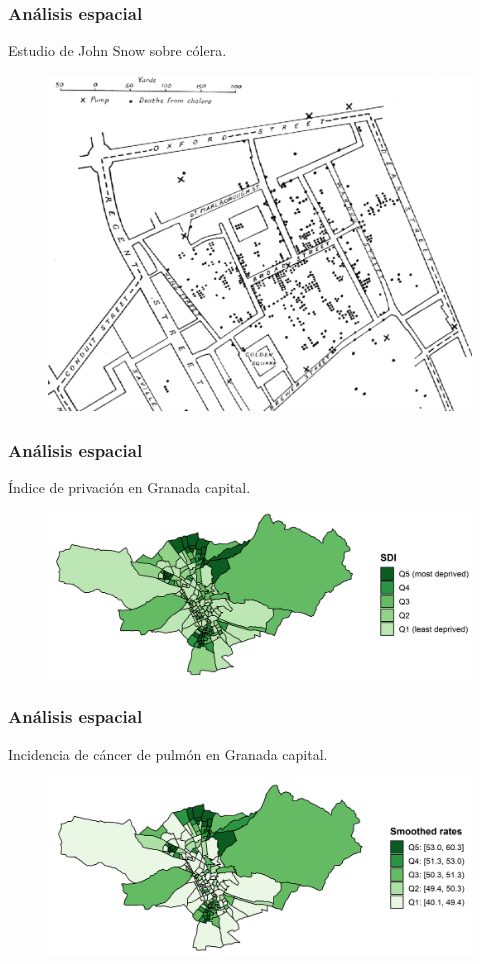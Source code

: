 \documentclass{beamer}
\begin{document}

\begin{frame}\frametitle{Análisis espacial}
	\centering Estudio de John Snow sobre cólera.
	\begin{figure}
		\centering
		\includegraphics[width=.75\textwidth]{images/mapa_3.png}
	\end{figure}
\end{frame}

\begin{frame}\frametitle{Análisis espacial}
	\centering Índice de privación en Granada capital.
	\begin{figure}
		\centering
		\includegraphics[width=.9\textwidth]{images/maps_DI_zoom.png}
	\end{figure}
\end{frame}


\begin{frame}\frametitle{Análisis espacial}

	\centering Incidencia de cáncer de pulmón en Granada capital.
	\begin{figure}
		\centering
		\includegraphics[width=.9\textwidth]{images/03_lung_ebs_zoom.png}
	\end{figure}
\end{frame}
\end{document}
